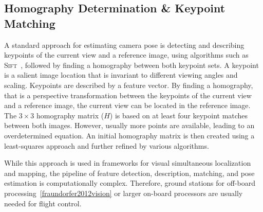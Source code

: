 \subsection{Homography Determination \& Keypoint Matching}
\label{sec:keypointmatching}

A standard approach for estimating camera pose is detecting and
describing keypoints of the current view and a reference image, using
algorithms such as \textsc{Sift}~\cite{lowe1999object}, followed by finding a homography between both keypoint sets. A
keypoint is a salient image location that is invariant to different
viewing angles and scaling. Keypoints are described by a feature vector. By finding a homography, that is a perspective transformation between the keypoints of the current view and a reference image, the current view can be located in the reference image. The $3 \times 3$
homography matrix ($H$) is based on at least four keypoint matches
between both images. However, usually more points are available,
leading to an overdetermined equation. An initial homography matrix is
then created using a least-squares approach and further refined by
various algorithms.

While this approach is used in frameworks for visual simultaneous localization and mapping, the pipeline of feature detection, description, matching, and pose estimation is computationally complex. Therefore, ground stations for off-board processing~\ref{fraundorfer2012vision} or larger on-board processors are usually needed for flight control.  

